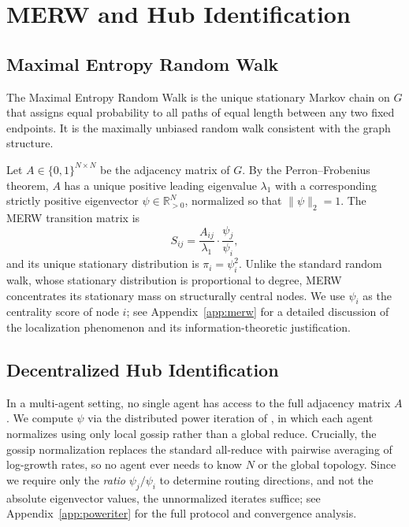 \documentclass{article}
\begin{document}
\section{MERW and Hub Identification}
\label{sec:merw}

\subsection{Maximal Entropy Random Walk}

The Maximal Entropy Random Walk \cite{burda2009localization} is the unique stationary Markov chain on $G$ that assigns equal probability to all paths of equal length between any two fixed endpoints. It is the maximally unbiased random walk consistent with the graph structure.

Let $A \in \{0,1\}^{N \times N}$ be the adjacency matrix of $G$. By the Perron--Frobenius theorem, $A$ has a unique positive leading eigenvalue $\lambda_1$ with a corresponding strictly positive eigenvector $\psi \in \mathbb{R}^N_{>0}$, normalized so that $\|\psi\|_2 = 1$. The MERW transition matrix is
\[
S_{ij} = \frac{A_{ij}}{\lambda_1} \cdot \frac{\psi_j}{\psi_i},
\]
and its unique stationary distribution is $\pi_i = \psi_i^2$. Unlike the standard random walk, whose stationary distribution is proportional to degree, MERW concentrates its stationary mass on structurally central nodes. We use $\psi_i$ as the centrality score of node $i$; see Appendix~\ref{app:merw} for a detailed discussion of the localization phenomenon and its information-theoretic justification.

\subsection{Decentralized Hub Identification}

In a multi-agent setting, no single agent has access to the full adjacency matrix $A$. We compute $\psi$ via the distributed power iteration of \cite{jelasity2007asynchronous}, in which each agent normalizes using only local gossip rather than a global reduce. Crucially, the gossip normalization replaces the standard all-reduce with pairwise averaging of log-growth rates, so no agent ever needs to know $N$ or the global topology. Since we require only the \emph{ratio} $\psi_j / \psi_i$ to determine routing directions, and not the absolute eigenvector values, the unnormalized iterates suffice; see Appendix~\ref{app:poweriter} for the full protocol and convergence analysis.
\end{document}
